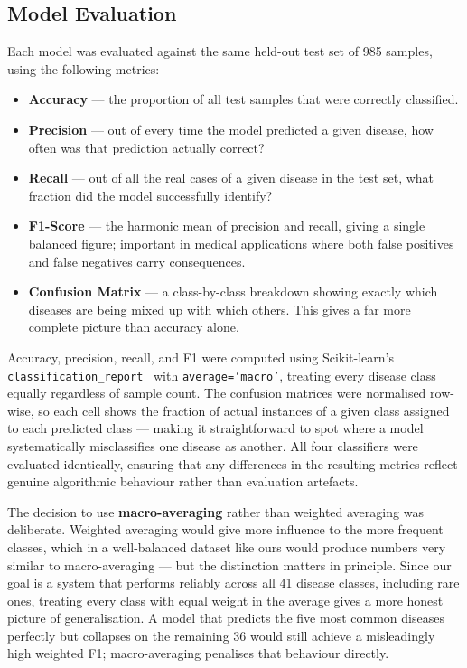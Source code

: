 \documentclass[12pt,a4paper]{article}
\begin{document}
\subsection{Model Evaluation}

Each model was evaluated against the same held-out test set of 985 samples, using the following metrics:
\begin{itemize}
    \item \textbf{Accuracy} --- the proportion of all test samples that were correctly classified.
    \item \textbf{Precision} --- out of every time the model predicted a given disease, how often was that prediction actually correct?
    \item \textbf{Recall} --- out of all the real cases of a given disease in the test set, what fraction did the model successfully identify?
    \item \textbf{F1-Score} --- the harmonic mean of precision and recall, giving a single balanced figure; important in medical applications where both false positives and false negatives carry consequences.
    \item \textbf{Confusion Matrix} --- a class-by-class breakdown showing exactly which diseases are being mixed up with which others. This gives a far more complete picture than accuracy alone.
\end{itemize}

\noindent Accuracy, precision, recall, and F1 were computed using Scikit-learn's \texttt{classification\_report}~\cite{pedregosa2011} with \texttt{average='macro'}, treating every disease class equally regardless of sample count. The confusion matrices were normalised row-wise, so each cell shows the fraction of actual instances of a given class assigned to each predicted class --- making it straightforward to spot where a model systematically misclassifies one disease as another. All four classifiers were evaluated identically, ensuring that any differences in the resulting metrics reflect genuine algorithmic behaviour rather than evaluation artefacts.

\noindent The decision to use \textbf{macro-averaging} rather than weighted averaging was deliberate. Weighted averaging would give more influence to the more frequent classes, which in a well-balanced dataset like ours would produce numbers very similar to macro-averaging --- but the distinction matters in principle. Since our goal is a system that performs reliably across all 41 disease classes, including rare ones, treating every class with equal weight in the average gives a more honest picture of generalisation. A model that predicts the five most common diseases perfectly but collapses on the remaining 36 would still achieve a misleadingly high weighted F1; macro-averaging penalises that behaviour directly.
\end{document}
